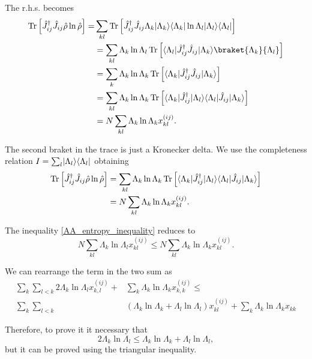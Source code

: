 The r.h.s. becomes
\begin{equation}
    \begin{split}
        \Tr\left[\hat J_{ij}^\dagger \hat J_{ij}\hat\rho\ln\hat\rho\right]=& \sum_{kl}\Tr\left[\hat J_{ij}^\dagger \hat J_{ij}\Lambda_k\ket{\Lambda_k}\bra{\Lambda_k}\ln\Lambda_l\ket{\Lambda_l}\bra{\Lambda_l}\right]\\
        & = \sum_{kl}\Lambda_k\ln\Lambda_l\Tr\left[\bra{\Lambda_l}\hat J_{ij}^\dagger\hat J_{ij}\ket{\Lambda_k}\braket{\Lambda_k}{\Lambda_l}\right]\\
        &= \sum_{k}\Lambda_k\ln\Lambda_k\Tr\left[\bra{\Lambda_k}\hat J_{ij}^\dagger\hat J_{ij}\ket{\Lambda_k}\right]\\
        &= \sum_{kl}\Lambda_k\ln\Lambda_k\Tr\left[\bra{\Lambda_k}\hat J_{ij}^\dagger\ket{\Lambda_l}\bra{\Lambda_l}\hat J_{ij}\ket{\Lambda_k}\right]\\
        &= N\sum_{kl}\Lambda_k\ln\Lambda_k x^{(ij)}_{kl}.\\
    \end{split}
\end{equation}

The second braket in the trace is just a Kronecker delta. We use the completeness relation $I = \sum_l\lvert\Lambda_l\rangle\langle\Lambda_l\rvert$ obtaining
\begin{equation}
    \begin{split}
        \operatorname{Tr}\left[\hat J_{ij}^\dagger \hat J_{ij}\hat\rho\ln\hat\rho\right]&= \sum_{kl}\Lambda_k\ln\Lambda_k\operatorname{Tr}\left[\langle\Lambda_k\rvert\hat J_{ij}^\dagger\lvert\Lambda_l\rangle\langle\Lambda_l\rvert\hat J_{ij}\lvert\Lambda_k\rangle\right]\\
        &= N\sum_{kl}\Lambda_k\ln\Lambda_k x^{(ij)}_{kl}.\\
    \end{split}
\end{equation}


The inequality \eqref{AA_entropy_inequality} reduces to 
\begin{equation}
    N \sum_{kl}\Lambda_k\ln\Lambda_lx^{(ij)}_{kl} \leq N\sum_{kl}\Lambda_k\ln\Lambda_k x^{(ij)}_{kl}.
\end{equation}

We can rearrange the term in the two sum as
\begin{equation}
    \begin{split}
        \sum_{k}\sum_{l<k}2\Lambda_k\ln\Lambda_lx^{(ij)}_{k,l} +& \sum_k\Lambda_k\ln\Lambda_k x^{(ij)}_{k,k} \leq\\ 
        \sum_{k}\sum_{l<k}&\left(\Lambda_k\ln\Lambda_k+ \Lambda_l\ln\Lambda_l\right)x^{(ij)}_{kl} + \sum_{k}\Lambda_k\ln\Lambda_k x_{kk} 
    \end{split}
\end{equation}

Therefore, to prove it it necessary that 
\begin{equation}
    2\Lambda_k\ln\Lambda_l \leq \Lambda_k\ln\Lambda_k+ \Lambda_l\ln\Lambda_l, 
\end{equation}
but it can be proved using the triangular inequality.